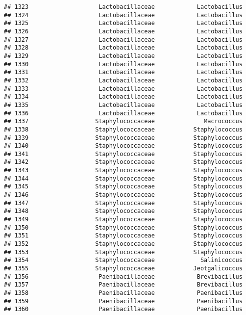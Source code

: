 \documentclass[
]{article}
\begin{document}
\begin{verbatim}
## 1323                    Lactobacillaceae            Lactobacillus
## 1324                    Lactobacillaceae            Lactobacillus
## 1325                    Lactobacillaceae            Lactobacillus
## 1326                    Lactobacillaceae            Lactobacillus
## 1327                    Lactobacillaceae            Lactobacillus
## 1328                    Lactobacillaceae            Lactobacillus
## 1329                    Lactobacillaceae            Lactobacillus
## 1330                    Lactobacillaceae            Lactobacillus
## 1331                    Lactobacillaceae            Lactobacillus
## 1332                    Lactobacillaceae            Lactobacillus
## 1333                    Lactobacillaceae            Lactobacillus
## 1334                    Lactobacillaceae            Lactobacillus
## 1335                    Lactobacillaceae            Lactobacillus
## 1336                    Lactobacillaceae            Lactobacillus
## 1337                   Staphylococcaceae              Macrococcus
## 1338                   Staphylococcaceae           Staphylococcus
## 1339                   Staphylococcaceae           Staphylococcus
## 1340                   Staphylococcaceae           Staphylococcus
## 1341                   Staphylococcaceae           Staphylococcus
## 1342                   Staphylococcaceae           Staphylococcus
## 1343                   Staphylococcaceae           Staphylococcus
## 1344                   Staphylococcaceae           Staphylococcus
## 1345                   Staphylococcaceae           Staphylococcus
## 1346                   Staphylococcaceae           Staphylococcus
## 1347                   Staphylococcaceae           Staphylococcus
## 1348                   Staphylococcaceae           Staphylococcus
## 1349                   Staphylococcaceae           Staphylococcus
## 1350                   Staphylococcaceae           Staphylococcus
## 1351                   Staphylococcaceae           Staphylococcus
## 1352                   Staphylococcaceae           Staphylococcus
## 1353                   Staphylococcaceae           Staphylococcus
## 1354                   Staphylococcaceae             Salinicoccus
## 1355                   Staphylococcaceae           Jeotgalicoccus
## 1356                    Paenibacillaceae            Brevibacillus
## 1357                    Paenibacillaceae            Brevibacillus
## 1358                    Paenibacillaceae            Paenibacillus
## 1359                    Paenibacillaceae            Paenibacillus
## 1360                    Paenibacillaceae            Paenibacillus

\end{verbatim}
\end{document}
